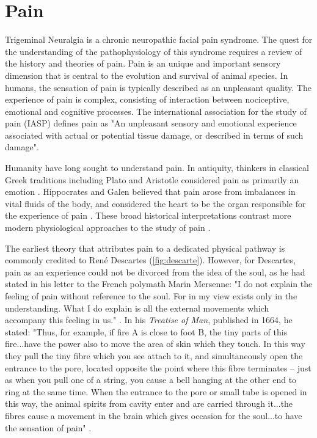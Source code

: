 \section{Pain}

Trigeminal Neuralgia is a chronic neuropathic facial pain syndrome. The quest for the understanding of the pathophysiology of this syndrome requires a review of the history and theories of pain. Pain is an unique and important sensory dimension that is central to the evolution and survival of animal species. In humans, the sensation of pain is typically described as an unpleasant quality. The experience of pain is complex, consisting of interaction between nociceptive, emotional and cognitive processes. The international association for the study of pain (IASP) defines pain as "An unpleasant sensory and emotional experience associated with actual or potential tissue damage, or described in terms of such damage"\cite{Merskey2012}. 

Humanity have long sought to understand pain. In antiquity, thinkers in classical Greek traditions including Plato and Aristotle considered pain as primarily an emotion \cite{Moayedi2012a}. Hippocrates and Galen believed that pain arose from imbalances in vital fluids of the body, and considered the heart to be the organ responsible for the experience of pain \cite{Melzack1999}. These broad historical interpretations contrast more modern physiological approaches to the study of pain \cite{Melzack1999,Moayedi2012a}.

The earliest theory that attributes pain to a dedicated physical pathway is commonly credited to Ren\'{e} Descartes (\ref{fig:descarte}). However, for Descartes, pain as an experience  could not be divorced from the idea of the soul, as he had stated in his letter to the French polymath Marin Mersenne: "I do not explain the feeling of pain without reference to the soul. For in my view exists only in the understanding. What I do explain is all the external movements which accompany this feeling in us." \cite[p. 148]{BookCottingham1991v3}. In his \textit{Treatise of Man}, published in 1664, he stated: "Thus, for example, if fire A is close to foot B, the tiny parts of this fire...have the power also to move the area of skin which they touch. In this way they pull the tiny fibre which you see attach to it, and simultaneously open the entrance to the pore, located opposite the point where this fibre terminates -- just as when you pull one of a string, you cause a bell hanging at the other end to ring at the same time. When the entrance to the pore or small tube is opened in this way, the animal spirits from cavity enter and are carried through it...the fibres cause a movement in the brain which gives occasion for the soul...to have the sensation of pain" \cite[p.101-103]{BookCottingham1991v1}.

